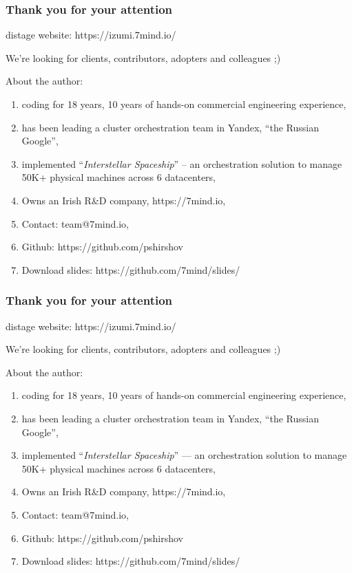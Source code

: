 \documentclass[usenames,dvipsnames]{beamer}
\begin{document}
\begin{frame}
    \frametitle{Thank you for your attention}

    \begin{center}
      distage website: https://izumi.7mind.io/

      We're looking for clients, contributors, adopters and colleagues ;)
    \end{center}

    About the author:
    \begin{enumerate}
        \item coding for 18 years, 10 years of hands-on commercial engineering experience,
        \item has been leading a cluster orchestration team in Yandex, ``the Russian Google'',
        \item implemented ``\textit{Interstellar Spaceship}'' -- an orchestration solution to manage 50K+ physical machines across 6 datacenters,
        \item Owns an Irish R\&D company, https://7mind.io,
        \item Contact: team@7mind.io,
        \item Github: https://github.com/pshirshov
        \item Download slides: https://github.com/7mind/slides/
    \end{enumerate}
\end{frame}

\begin{frame}
    \frametitle{Thank you for your attention}

    \begin{center}
      distage website: https://izumi.7mind.io/

      We're looking for clients, contributors, adopters and colleagues ;)
    \end{center}

    About the author:
    \begin{enumerate}
        \item coding for 18 years, 10 years of hands-on commercial engineering experience,
        \item has been leading a cluster orchestration team in Yandex, ``the Russian Google'',
        \item implemented ``\textit{Interstellar Spaceship}'' --- an orchestration solution to manage 50K+ physical machines across 6 datacenters,
        \item Owns an Irish R\&D company, https://7mind.io,
        \item Contact: team@7mind.io,
        \item Github: https://github.com/pshirshov
        \item Download slides: https://github.com/7mind/slides/
    \end{enumerate}
\end{frame}
\end{document}

